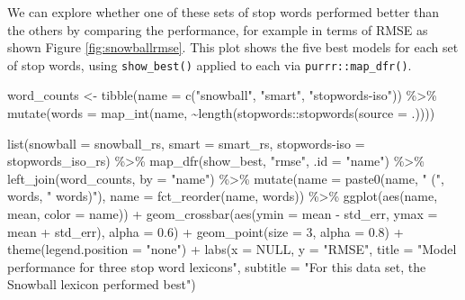 \documentclass[
]{krantz}
\makeatletter
\newenvironment{Shaded}{\begin{snugshade}}{\end{snugshade}}
\newcommand{\AttributeTok}[1]{\textcolor[rgb]{0.77,0.63,0.00}{#1}}
\newcommand{\ConstantTok}[1]{\textcolor[rgb]{0.00,0.00,0.00}{#1}}
\newcommand{\DecValTok}[1]{\textcolor[rgb]{0.00,0.00,0.81}{#1}}
\newcommand{\FloatTok}[1]{\textcolor[rgb]{0.00,0.00,0.81}{#1}}
\newcommand{\FunctionTok}[1]{\textcolor[rgb]{0.00,0.00,0.00}{#1}}
\newcommand{\NormalTok}[1]{#1}
\newcommand{\OtherTok}[1]{\textcolor[rgb]{0.56,0.35,0.01}{#1}}
\newcommand{\SpecialCharTok}[1]{\textcolor[rgb]{0.00,0.00,0.00}{#1}}
\newcommand{\StringTok}[1]{\textcolor[rgb]{0.31,0.60,0.02}{#1}}
\newenvironment{kframe}{%
\medskip{}
\setlength{\fboxsep}{.8em}
 \def\at@end@of@kframe{}%
 \ifinner\ifhmode%
  \def\at@end@of@kframe{\end{minipage}}%
  \begin{minipage}{\columnwidth}%
 \fi\fi%
 \def\FrameCommand##1{\hskip\@totalleftmargin \hskip-\fboxsep
 \colorbox{shadecolor}{##1}\hskip-\fboxsep
     \hskip-\linewidth \hskip-\@totalleftmargin \hskip\columnwidth}%
 \MakeFramed {\advance\hsize-\width
   \@totalleftmargin\z@ \linewidth\hsize
   \@setminipage}}%
 {\par\unskip\endMakeFramed%
 \at@end@of@kframe}
\renewenvironment{Shaded}{\begin{kframe}}{\end{kframe}}
\makeatother
\begin{document}
We can explore whether one of these sets of stop words performed better than the others by comparing the performance, for example in terms of RMSE as shown Figure \ref{fig:snowballrmse}. This plot shows the five best models for each set of stop words, using \texttt{show\_best()} applied to each via \texttt{purrr::map\_dfr()}.

\begin{Shaded}
\begin{Highlighting}[]
\NormalTok{word\_counts }\OtherTok{\textless{}{-}} \FunctionTok{tibble}\NormalTok{(}\AttributeTok{name =} \FunctionTok{c}\NormalTok{(}\StringTok{"snowball"}\NormalTok{, }\StringTok{"smart"}\NormalTok{, }\StringTok{"stopwords{-}iso"}\NormalTok{)) }\SpecialCharTok{\%\textgreater{}\%}
  \FunctionTok{mutate}\NormalTok{(}\AttributeTok{words =} \FunctionTok{map\_int}\NormalTok{(name, }\SpecialCharTok{\textasciitilde{}}\FunctionTok{length}\NormalTok{(stopwords}\SpecialCharTok{::}\FunctionTok{stopwords}\NormalTok{(}\AttributeTok{source =}\NormalTok{ .))))}

\FunctionTok{list}\NormalTok{(}\AttributeTok{snowball =}\NormalTok{ snowball\_rs,}
     \AttributeTok{smart =}\NormalTok{ smart\_rs,}
     \StringTok{\textasciigrave{}}\AttributeTok{stopwords{-}iso}\StringTok{\textasciigrave{}} \OtherTok{=}\NormalTok{ stopwords\_iso\_rs) }\SpecialCharTok{\%\textgreater{}\%}
  \FunctionTok{map\_dfr}\NormalTok{(show\_best, }\StringTok{"rmse"}\NormalTok{, }\AttributeTok{.id =} \StringTok{"name"}\NormalTok{) }\SpecialCharTok{\%\textgreater{}\%}
  \FunctionTok{left\_join}\NormalTok{(word\_counts, }\AttributeTok{by =} \StringTok{"name"}\NormalTok{) }\SpecialCharTok{\%\textgreater{}\%}
  \FunctionTok{mutate}\NormalTok{(}\AttributeTok{name =} \FunctionTok{paste0}\NormalTok{(name, }\StringTok{" ("}\NormalTok{, words, }\StringTok{" words)"}\NormalTok{),}
         \AttributeTok{name =} \FunctionTok{fct\_reorder}\NormalTok{(name, words)) }\SpecialCharTok{\%\textgreater{}\%}
  \FunctionTok{ggplot}\NormalTok{(}\FunctionTok{aes}\NormalTok{(name, mean, }\AttributeTok{color =}\NormalTok{ name)) }\SpecialCharTok{+}
  \FunctionTok{geom\_crossbar}\NormalTok{(}\FunctionTok{aes}\NormalTok{(}\AttributeTok{ymin =}\NormalTok{ mean }\SpecialCharTok{{-}}\NormalTok{ std\_err, }\AttributeTok{ymax =}\NormalTok{ mean }\SpecialCharTok{+}\NormalTok{ std\_err), }\AttributeTok{alpha =} \FloatTok{0.6}\NormalTok{) }\SpecialCharTok{+}
  \FunctionTok{geom\_point}\NormalTok{(}\AttributeTok{size =} \DecValTok{3}\NormalTok{, }\AttributeTok{alpha =} \FloatTok{0.8}\NormalTok{) }\SpecialCharTok{+}
  \FunctionTok{theme}\NormalTok{(}\AttributeTok{legend.position =} \StringTok{"none"}\NormalTok{) }\SpecialCharTok{+}
  \FunctionTok{labs}\NormalTok{(}\AttributeTok{x =} \ConstantTok{NULL}\NormalTok{, }\AttributeTok{y =} \StringTok{"RMSE"}\NormalTok{,}
       \AttributeTok{title =} \StringTok{"Model performance for three stop word lexicons"}\NormalTok{,}
       \AttributeTok{subtitle =} \StringTok{"For this data set, the Snowball lexicon performed best"}\NormalTok{)}
\end{Highlighting}
\end{Shaded}
\end{document}
